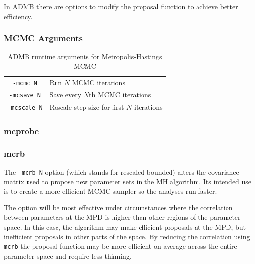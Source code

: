 \documentclass{article}
\begin{document}
In ADMB there are options to modify the proposal function to
achieve better efficiency.

\subsubsection{MCMC Arguments}
\begin{table}[h]
  \centering
  \begin{tabular}[h]{|cl|}
    \hline
    \texttt{-mcmc N} & Run $N$ MCMC iterations\\
    \texttt{-mcsave N} & Save every $N$th MCMC iterations\\
    \texttt{-mcscale N} & Rescale step size for first $N$ iterations\\
    \hline
  \end{tabular}
  \caption{ADMB runtime arguments for Metropolis-Hastings MCMC}
  \label{tab:mh_args}
\end{table}
\subsubsection{mcprobe}

\subsubsection{mcrb}
The \texttt{-mcrb N} option (which stands for rescaled
bounded) alters the covariance matrix used to propose new
parameter sets in the MH algorithm. Its intended use is to
create a more efficient MCMC sampler so the analyses run
faster. 

The option will be most effective under circumstances where
the correlation between parameters at the MPD is higher than
other regions of the parameter space. In this case, the
algorithm may make efficient proposals at the MPD, but
inefficient proposals in other parts of the space. By
reducing the correlation using \texttt{mcrb} the proposal
function may be more efficient on average across the entire
parameter space and require less thinning.
\end{document}
